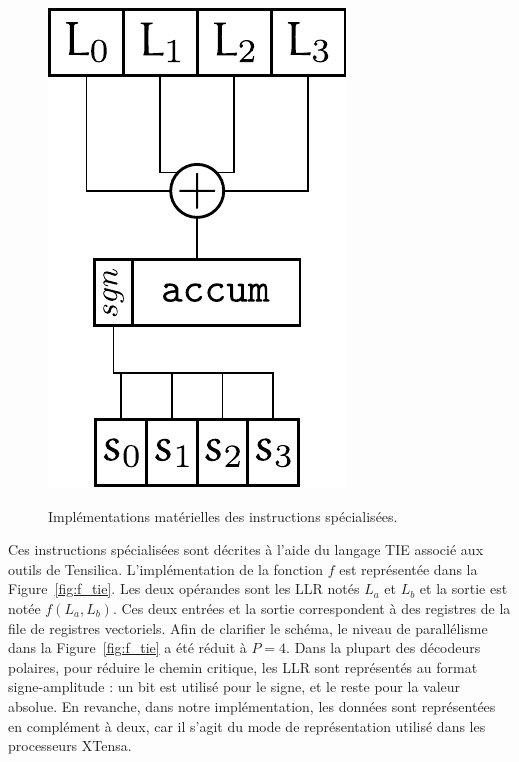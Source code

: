 \begin{figure}[t]
{  \includegraphics[scale=0.45]{main/ch3_fig/rep_tie}
  \label{fig:rep_tie}
  } \quad\quad\quad\quad\quad\quad\quad\quad\quad\quad
  \caption{Implémentations matérielles des instructions spécialisées.}
\end{figure}
Ces instructions spécialisées sont décrites à l'aide du langage TIE associé aux outils de Tensilica.
L'implémentation de la fonction $f$ est représentée dans la Figure~\ref{fig:f_tie}. Les deux opérandes sont les LLR notés $L_a$ et $L_b$ et la sortie est notée $f(L_a,L_b)$. Ces deux entrées et la sortie correspondent à des registres de la file de registres vectoriels. Afin de clarifier le schéma, le niveau de parallélisme dans la Figure~\ref{fig:f_tie} a été réduit à $P=4$. Dans la plupart des décodeurs polaires, pour réduire le chemin critique, les LLR sont représentés au format \og signe-amplitude \fg : un bit est utilisé pour le signe, et le reste pour la valeur absolue. En revanche, dans notre implémentation, les données sont représentées en complément à deux, car il s'agit du mode de représentation utilisé dans les processeurs XTensa.

